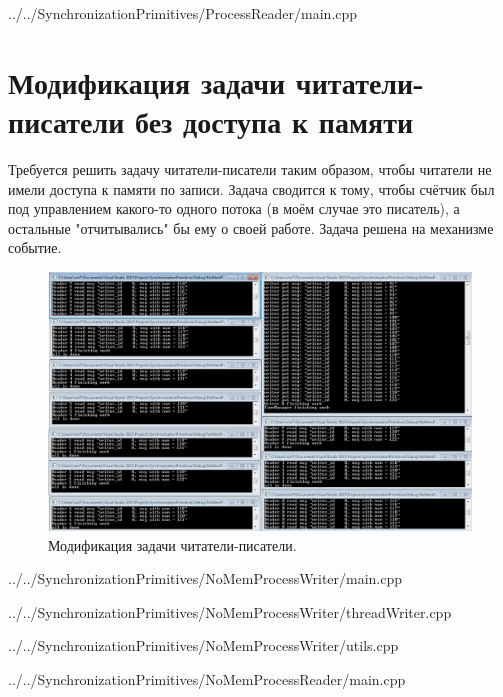 \documentclass[a4paper, 12pt]{article}		%
\begin{document}

{../../SynchronizationPrimitives/ProcessReader/main.cpp}


\newpage
\section{Модификация задачи читатели-писатели без доступа к памяти}

Требуется решить задачу читатели-писатели таким образом, чтобы читатели не имели доступа к памяти по записи. Задача сводится к тому, чтобы счётчик был под управлением какого-то одного потока (в моём случае это писатель), а остальные "отчитывались" бы ему о своей работе. Задача решена на механизме событие.

\begin{figure}[h!]
\centering
\includegraphics[scale=0.50]{res/008}
\caption{Модификация задачи читатели-писатели.}
\end{figure}


{../../SynchronizationPrimitives/NoMemProcessWriter/main.cpp}


{../../SynchronizationPrimitives/NoMemProcessWriter/threadWriter.cpp}


{../../SynchronizationPrimitives/NoMemProcessWriter/utils.cpp}


{../../SynchronizationPrimitives/NoMemProcessReader/main.cpp}

\newpage
\end{document}
